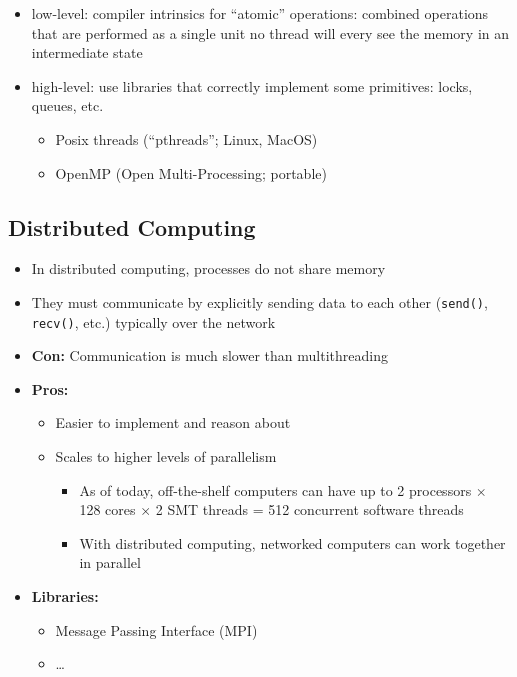 \documentclass[12pt]{article}
\begin{document}
\begin{itemize}
    \item low-level: compiler intrinsics for ``atomic'' operations:
    combined operations that are performed as a single unit
    no thread will every see the memory in an intermediate state
    
    \item high-level: use libraries that correctly implement some primitives:
    locks, queues, etc.
    \begin{itemize}
        \item Posix threads (``pthreads''; Linux, MacOS)
        \item OpenMP (Open Multi-Processing; portable)
    \end{itemize}
\end{itemize}

\subsection{Distributed Computing}


\begin{itemize}
  \item In distributed computing, processes do not share memory
  \item They must communicate by explicitly sending data to each other (\texttt{send()}, \texttt{recv()}, etc.) typically over the network
\end{itemize}


\begin{itemize}
  \item \textbf{Con:} Communication is much slower than multithreading
  \item \textbf{Pros:}
  \begin{itemize}
    \item Easier to implement and reason about
    \item Scales to higher levels of parallelism
    \begin{itemize}
      \item As of today, off-the-shelf computers can have up to 2 processors $\times$ 128 cores $\times$ 2 SMT threads = 512 concurrent software threads
      \item With distributed computing, networked computers can work together in parallel
    \end{itemize}
  \end{itemize}
  \item \textbf{Libraries:}
  \begin{itemize}
    \item Message Passing Interface (MPI)
    \item \ldots %
  \end{itemize}
\end{itemize}
\end{document}
